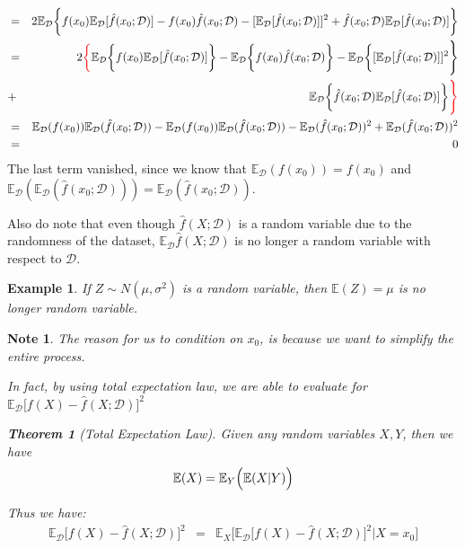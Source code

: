 \documentclass{article}
\theoremstyle{MyNonumberplain}
\theoremstyle{break}
\newcommand{\ev}{\mathbb{E}}
\newcommand{\evd}{\ev_{\mathcal{D}}}
\theoremstyle{break}
\newtheorem{theorem}{Theorem}[section]
\newtheorem{example}{Example}[section]
\newtheorem{note}{Note}
\theoremstyle{break}
\theoremstyle{break}
\begin{document}
\begin{thmbox}
    \begin{prfbox}
        \begin{eqnarray*}
            &=& 2 \evd \biggl\{f(x_0)\evd[\hat{f}(x_0;\mathcal{D})]-f(x_0)\hat{f}(x_0;\mathcal{D})-[\evd[\hat{f}(x_0;\mathcal{D})]]^2+\hat{f}(x_0;\mathcal{D})\evd[\hat{f}(x_0;\mathcal{D})]\biggr\} \\
            &=& 2  \textcolor{red}{\biggl\{}\evd\biggl\{f(x_0)\evd[\hat{f}(x_0;\mathcal{D})]\biggr\}-\evd\biggl\{f(x_0)\hat{f}(x_0;\mathcal{D})\biggr\}-\evd\biggl\{[\evd[\hat{f}(x_0;\mathcal{D})]]^2\Biggr\} \\
            &+& \evd\biggl\{\hat{f}(x_0;\mathcal{D})\evd[\hat{f}(x_0;\mathcal{D})]\biggr\}\textcolor{red}{\Biggr\}}\\
            &=& \evd(f(x_0))\evd(\hat{f}(x_0;\mathcal{D}))-\evd(f(x_0))\evd(\hat{f}(x_0;\mathcal{D}))-\evd(\hat{f}(x_0;\mathcal{D}))^2+\evd(\hat{f}(x_0;\mathcal{D}))^2\\
            &=& 0
        \end{eqnarray*}
        The last term vanished, since we know that $\evd(f(x_0))=f(x_0)$ and $\evd(\evd(\hat{f}(x_0;\mathcal{D}))) = \evd(\hat{f}(x_0;\mathcal{D})).$

        \bigskip
        Also do note that even though $\hat{f}(X;\mathcal{D})$ is a random variable due to the randomness of the dataset, $\evd\hat{f}(X;\mathcal{D})$ is 
        no longer a random variable with respect to $\mathcal{D}$.

        \begin{expbox}
            \begin{example}
                If $Z\sim N(\mu,\sigma^2)$ is a random variable, then $\ev(Z)=\mu$ is no longer random variable.
            \end{example}
        \end{expbox}

    \end{prfbox}
\end{thmbox}
\begin{notebox}
    \begin{note}
        The reason for us to condition on $x_0$, is because we want to simplify the entire process.

        In fact, by using total expectation law, we are able to evaluate for $\evd\bigl[f(X)-\hat{f}(X;\mathcal{D})\bigr]^2$

        \begin{thmbox}
            \begin{theorem}[Total Expectation Law]
                Given any random variables $X,Y$, then we have 
                $$\ev(X)=\ev_Y\Bigl(\ev(X|Y)\Bigr)$$ 
            \end{theorem}
        \end{thmbox}
        Thus we have: 
        \begin{eqnarray*}
            \evd\bigl[f(X)-\hat{f}(X;\mathcal{D})\bigr]^2 &=& \ev_X\biggl[\evd\bigl[f(X)-\hat{f}(X;\mathcal{D})\bigr]^2|X=x_0\biggr]
        \end{eqnarray*}
    \end{note}
\end{notebox}
\end{document}
